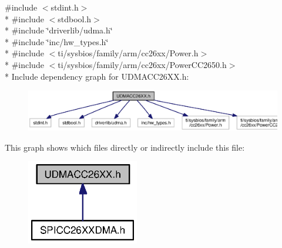 {\ttfamily \#include $<$stdint.\-h$>$}\\*
{\ttfamily \#include $<$stdbool.\-h$>$}\\*
{\ttfamily \#include \char`\"{}driverlib/udma.\-h\char`\"{}}\\*
{\ttfamily \#include \char`\"{}inc/hw\-\_\-types.\-h\char`\"{}}\\*
{\ttfamily \#include $<$ti/sysbios/family/arm/cc26xx/\-Power.\-h$>$}\\*
{\ttfamily \#include $<$ti/sysbios/family/arm/cc26xx/\-Power\-C\-C2650.\-h$>$}\\*
Include dependency graph for U\-D\-M\-A\-C\-C26\-X\-X.\-h\-:
\nopagebreak
\begin{figure}[H]
\begin{center}
\leavevmode
\includegraphics[width=350pt]{_u_d_m_a_c_c26_x_x_8h__incl}
\end{center}
\end{figure}
This graph shows which files directly or indirectly include this file\-:
\nopagebreak
\begin{figure}[H]
\begin{center}
\leavevmode
\includegraphics[width=139pt]{_u_d_m_a_c_c26_x_x_8h__dep__incl}
\end{center}
\end{figure}
